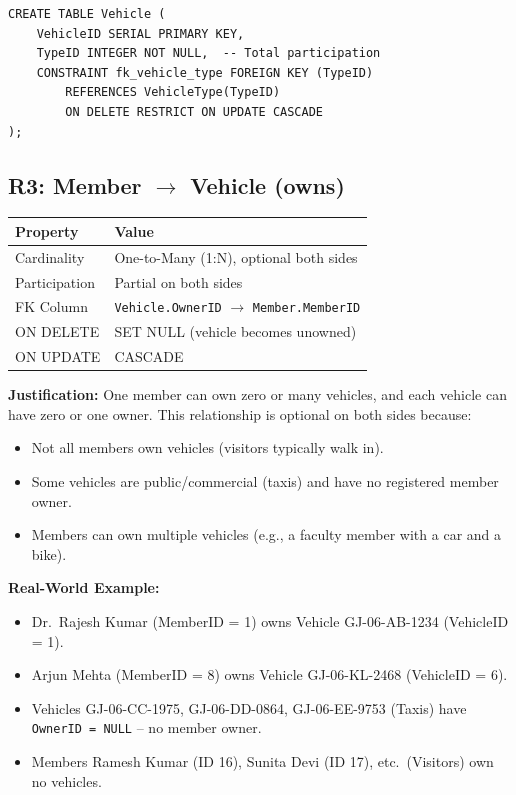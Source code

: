 \documentclass[a4paper, 12pt]{article}
\begin{document}
\begin{lstlisting}[style=sqlstyle, caption={R2 Implementation}, label={lst:r2}]
CREATE TABLE Vehicle (
    VehicleID SERIAL PRIMARY KEY,
    TypeID INTEGER NOT NULL,  -- Total participation
    CONSTRAINT fk_vehicle_type FOREIGN KEY (TypeID)
        REFERENCES VehicleType(TypeID)
        ON DELETE RESTRICT ON UPDATE CASCADE
);
\end{lstlisting}

\subsection{R3: Member \texorpdfstring{$\rightarrow$}{->} Vehicle (owns)}

\begin{table}[H]
\centering
\small
\begin{tabularx}{\textwidth}{l X}
\toprule
\textbf{Property} & \textbf{Value} \\
\midrule
Cardinality & One-to-Many (1:N), optional both sides \\
Participation & Partial on both sides \\
FK Column & \texttt{Vehicle.OwnerID} $\rightarrow$ \texttt{Member.MemberID} \\
ON DELETE & SET NULL (vehicle becomes unowned) \\
ON UPDATE & CASCADE \\
\bottomrule
\end{tabularx}
\end{table}

\textbf{Justification:} One member can own zero or many vehicles, and each vehicle can have zero or one owner. This relationship is optional on both sides because:
\begin{itemize}[leftmargin=*, nosep]
    \item Not all members own vehicles (visitors typically walk in).
    \item Some vehicles are public/commercial (taxis) and have no registered member owner.
    \item Members can own multiple vehicles (e.g., a faculty member with a car and a bike).
\end{itemize}

\textbf{Real-World Example:}
\begin{itemize}[leftmargin=*, nosep]
    \item Dr.\ Rajesh Kumar (MemberID = 1) owns Vehicle GJ-06-AB-1234 (VehicleID = 1).
    \item Arjun Mehta (MemberID = 8) owns Vehicle GJ-06-KL-2468 (VehicleID = 6).
    \item Vehicles GJ-06-CC-1975, GJ-06-DD-0864, GJ-06-EE-9753 (Taxis) have \texttt{OwnerID = NULL} -- no member owner.
    \item Members Ramesh Kumar (ID 16), Sunita Devi (ID 17), etc.\ (Visitors) own no vehicles.
\end{itemize}
\end{document}
